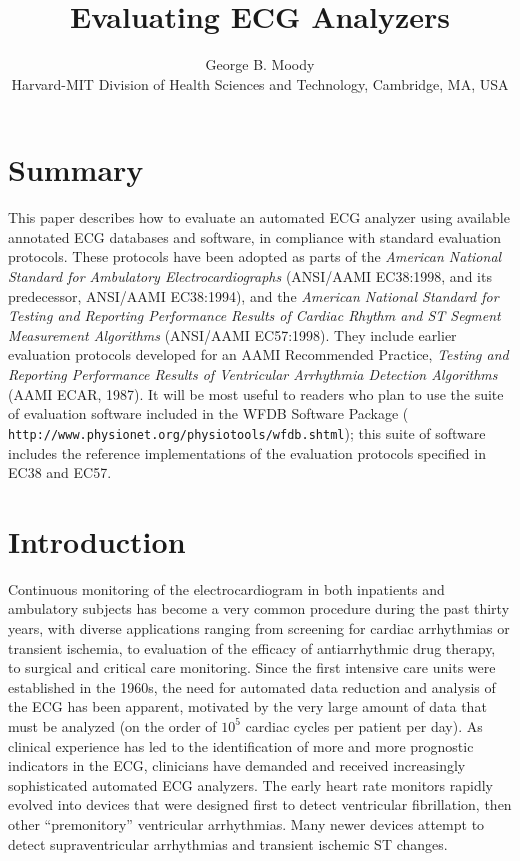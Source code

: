 \documentclass[twoside]{article}
\title{Evaluating ECG Analyzers}
\author{George B. Moody\\
Harvard-MIT Division of Health Sciences and Technology, Cambridge, MA, USA}
\date{}
\begin{document}
\setcounter{page}{FIRSTPAGE}

\maketitle

\section*{Summary}
This paper describes how to evaluate an automated ECG analyzer using
available annotated ECG databases and software, in compliance with
standard evaluation protocols.  These protocols have been adopted as
parts of the {\em American National Standard for Ambulatory
Electrocardiographs} (ANSI/AAMI EC38:1998, and its predecessor,
ANSI/AAMI EC38:1994), and the {\em American National Standard for
Testing and Reporting Performance Results of Cardiac Rhythm and ST
Segment Measurement Algorithms} (ANSI/AAMI EC57:1998).  They include
earlier evaluation protocols developed for an AAMI Recommended
Practice, {\em Testing and Reporting Performance Results of
Ventricular Arrhythmia Detection Algorithms} (AAMI ECAR, 1987).  It
will be most useful to readers who plan to use the suite of evaluation
software included in the WFDB Software Package ({\tt
http://www.\-physio\-net.\-org/\-physio\-tools/\-wfdb.\-shtml}); this
suite of software includes the reference implementations of the
evaluation protocols specified in EC38 and EC57.

\section{Introduction}
Continuous monitoring of the electrocardiogram in both inpatients and
ambulatory subjects has become a very common procedure during the past
thirty years, with diverse applications ranging from screening for cardiac
arrhythmias or transient ischemia, to evaluation of the efficacy of
antiarrhythmic drug therapy, to surgical and critical care monitoring.
Since the first intensive care units were established in the 1960s,
the need for automated data reduction and analysis of the ECG has been
apparent, motivated by the very large amount of data that must be
analyzed (on the order of $10^{5}$ cardiac cycles per patient per
day).  As clinical experience has led to the identification of more
and more prognostic indicators in the ECG, clinicians have demanded
and received increasingly sophisticated automated ECG analyzers.  The
early heart rate monitors rapidly evolved into devices that were
designed first to detect ventricular fibrillation, then other
``premonitory'' ventricular arrhythmias.  Many newer devices attempt
to detect supraventricular arrhythmias and transient ischemic ST
changes.
\end{document}

